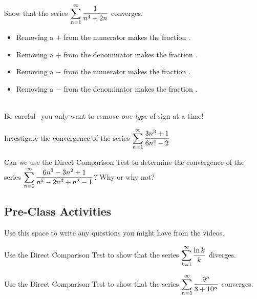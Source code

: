 \documentclass[notes]{subfiles}
\begin{document}
		\begin{ex}
			Show that the series $\displaystyle \sum_{n=1}^\infty \dfrac{1}{n^4 + 2n}$ converges.
		\end{ex}
			\newpage
			
		\begin{rmk}
			\begin{itemize}
				\setlength\itemsep{15pt}
				\item Removing a $+$ from the numerator makes the fraction .
				\item Removing a $+$ from the denominator makes the fraction .
				\item Removing a $-$ from the numerator makes the fraction .
				\item Removing a $-$ from the denominator makes the fraction .
			\end{itemize}\\
			Be careful$-$you only want to remove \emph{one type} of sign at a time!
		\end{rmk}
			
		\begin{ex}
			Investigate the convergence of the series $\displaystyle \sum_{n=1}^\infty \dfrac{3n^3 + 1}{6n^4 - 2}$
		\end{ex}
			
		\begin{ex}
			Can we use the Direct Comparison Test to determine the convergence of the series $\displaystyle \sum_{n=0}^\infty \dfrac{6n^3 - 3n^2 +1}{n^5 -2n^3 + n^2-1}$?  Why or why not?
		\end{ex}
			\newpage
			
	\subsection*{Pre-Class Activities}
		\begin{ex}
			Use this space to write any questions you might have from the videos.
		\end{ex}
			
		\begin{ex}
			Use the Direct Comparison Test to show that the series $\displaystyle \sum_{k = 1}^\infty \dfrac{\ln k}{k}$ diverges.
		\end{ex}
			
		\begin{ex}
			Use the Direct Comparison Test to show that the series $\displaystyle \sum_{n = 1}^\infty \dfrac{9^n}{3 + 10^n}$ converges.
		\end{ex}
			
\end{document}
